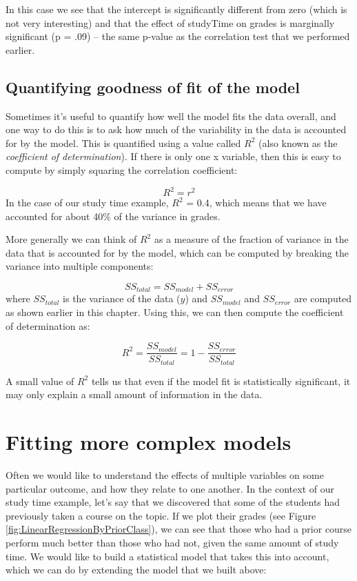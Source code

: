 \documentclass[12pt,]{book}
\theoremstyle{definition}
\theoremstyle{definition}
\theoremstyle{definition}
\theoremstyle{remark}
\begin{document}
In this case we see that the intercept is significantly different from zero (which is not very interesting) and that the effect of studyTime on grades is marginally significant (p = .09) -- the same p-value as the correlation test that we performed earlier.

\hypertarget{quantifying-goodness-of-fit-of-the-model}{%
\subsection{Quantifying goodness of fit of the model}\label{quantifying-goodness-of-fit-of-the-model}}

Sometimes it's useful to quantify how well the model fits the data overall, and one way to do this is to ask how much of the variability in the data is accounted for by the model. This is quantified using a value called \(R^2\) (also known as the \emph{coefficient of determination}). If there is only one x variable, then this is easy to compute by simply squaring the correlation coefficient:

\[
R^2 = r^2
\]
In the case of our study time example, \(R^2\) = 0.4, which means that we have accounted for about 40\% of the variance in grades.

More generally we can think of \(R^2\) as a measure of the fraction of variance in the data that is accounted for by the model, which can be computed by breaking the variance into multiple components:

\[
SS_{total} = SS_{model} + SS_{error}
\]
where \(SS_{total}\) is the variance of the data (\(y\)) and \(SS_{model}\) and \(SS_{error}\) are computed as shown earlier in this chapter. Using this, we can then compute the coefficient of determination as:

\[
R^2 = \frac{SS_{model}}{SS_{total}} = 1 - \frac{SS_{error}}{SS_{total}}
\]

A small value of \(R^2\) tells us that even if the model fit is statistically significant, it may only explain a small amount of information in the data.

\hypertarget{fitting-more-complex-models}{%
\section{Fitting more complex models}\label{fitting-more-complex-models}}

Often we would like to understand the effects of multiple variables on some particular outcome, and how they relate to one another. In the context of our study time example, let's say that we discovered that some of the students had previously taken a course on the topic. If we plot their grades (see Figure \ref{fig:LinearRegressionByPriorClass}), we can see that those who had a prior course perform much better than those who had not, given the same amount of study time. We would like to build a statistical model that takes this into account, which we can do by extending the model that we built above:
\end{document}
